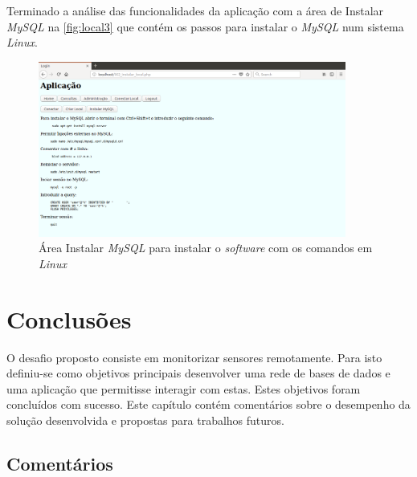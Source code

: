 \documentclass[11pt,twoside,a4paper]{report}
\begin{document}
\newpage
Terminado a análise das funcionalidades da aplicação com a área de Instalar \textit{MySQL} na \autoref{fig:local3} que contém os passos para instalar o \textit{MySQL} num sistema \textit{Linux}.
\begin{figure}[H]
	\centering
	\includegraphics[width=0.9\textwidth]{local04} %
	\caption{Área Instalar \textit{MySQL} para instalar o \textit{software} com os comandos em \textit{Linux}}
	\label{fig:local3}
\end{figure}


\cleardoublepage
\chapter{Conclusões}
O desafio proposto consiste em monitorizar sensores remotamente. Para isto definiu-se como objetivos principais desenvolver uma rede de bases de dados e uma aplicação que permitisse interagir com estas. Estes objetivos foram concluídos com sucesso. Este capítulo contém comentários sobre o desempenho da solução desenvolvida e propostas para trabalhos futuros.

\section{Comentários}
\end{document}

